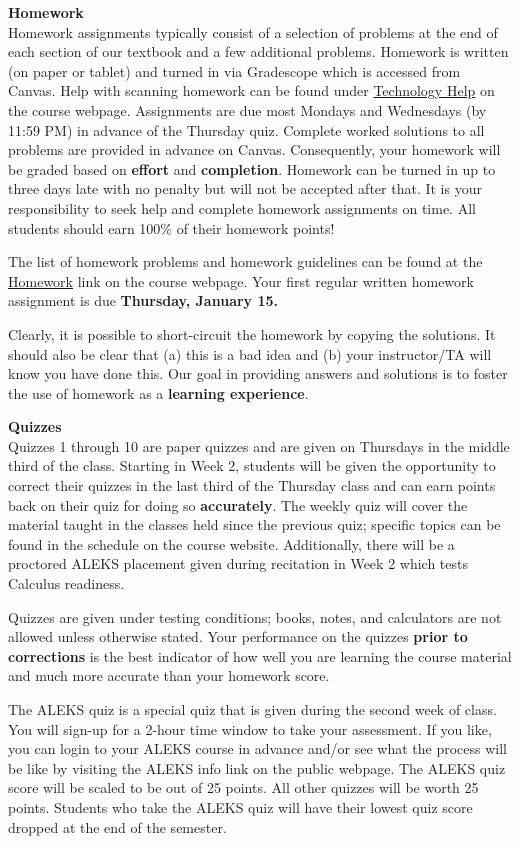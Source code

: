 \documentclass[12pt]{article}
\renewcommand{\emph}[1]{\textsf{\textbf{#1}}}
\newcommand{\localhead}[1]{\par\smallskip\textbf{#1}\nobreak\\}%
\def\heading#1{\localhead{\large\emph{#1}}}
\begin{document}
\heading{Homework}
Homework assignments typically consist of a selection of problems at
the end of each section of our textbook and a few additional
problems. Homework is written (on paper or tablet) and turned in via
Gradescope which is accessed from Canvas.  Help with scanning homework
can be found under
\href{https://uaf-math.github.io/calc1/techHelp.html}{Technology Help} on
the course webpage. Assignments are due most Mondays and Wednesdays
(by 11:59 PM) in advance of the Thursday quiz. Complete worked
solutions to all problems are provided in advance on
Canvas. Consequently, your homework will be graded based on
\emph{effort} and \emph{completion}. Homework can be turned in up to
three days late with no penalty but will not be accepted after that.
It is your responsibility to seek help and complete homework
assignments on time.
 All students should earn
100\% of their homework points!

The list of homework problems and homework guidelines can be found at the \href{https://uaf-math.github.io/calc1/newhomework.html}{Homework} link on the course webpage. Your first regular written homework assignment is due \emph{Thursday, January 15.}

Clearly, it is possible to short-circuit the homework by copying the solutions. It should also be clear that (a) this is a bad idea and (b) your instructor/TA will know you have done this. Our goal in providing answers and solutions is to foster the use of homework as a \emph{learning experience}. 



\heading{Quizzes}
Quizzes 1 through 10 are paper quizzes and are given on Thursdays in the middle third of the class. Starting in Week 2, students will be given the opportunity to correct their quizzes in the last third of the Thursday class and can earn points back on their quiz for doing so \emph{accurately}. The weekly quiz will cover the material taught in the classes held since the previous quiz; specific topics can be found in the schedule on the course website. Additionally, there will be a proctored ALEKS placement given during recitation in Week 2 which tests Calculus readiness.

Quizzes are given under testing conditions; books, notes, and calculators are not allowed unless otherwise stated. Your performance on the quizzes \emph{prior to corrections} is the best indicator of how well you are learning the course material and much more accurate than your homework score.

The ALEKS quiz is a special quiz that is given during the second week of class. You will sign-up for a 2-hour time window to take your assessment. If you like, you can login to your ALEKS course in advance and/or see what the process will be like by visiting the ALEKS info link on the public webpage. The ALEKS quiz score will be scaled to be out of 25 points. All other quizzes will be worth 25 points. Students who take the ALEKS quiz will have their lowest quiz score dropped at the end of the semester.
\end{document}
